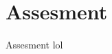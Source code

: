 \documentclass[compress,aspectratio=169]{beamer}
\begin{document}
\begin{frame}[plain]
	\titlepage
\end{frame}



\section{Assesment}
\begin{frame}{Assesment}
\label{pg:lastpage} %
lol
\end{frame}
\end{document}
